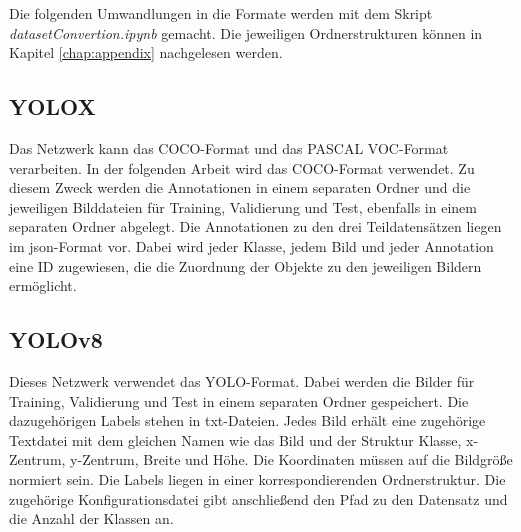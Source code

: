 Die folgenden Umwandlungen in die Formate werden mit dem Skript \textit{datasetConvertion.ipynb} gemacht. Die jeweiligen Ordnerstrukturen können in Kapitel \ref{chap:appendix} nachgelesen werden.


\subsection{YOLOX}
Das Netzwerk kann das COCO-Format und das PASCAL VOC-Format verarbeiten. In der folgenden Arbeit wird das COCO-Format verwendet. Zu diesem Zweck werden die Annotationen in einem separaten Ordner und die jeweiligen Bilddateien für Training, Validierung und Test, ebenfalls in einem separaten Ordner abgelegt. Die Annotationen zu den drei Teildatensätzen liegen im json-Format vor. Dabei wird jeder Klasse, jedem Bild und jeder Annotation eine ID zugewiesen, die die Zuordnung der Objekte zu den jeweiligen Bildern ermöglicht. 



\subsection{YOLOv8}
Dieses Netzwerk verwendet das YOLO-Format. Dabei werden die Bilder für Training, Validierung und Test in einem separaten Ordner gespeichert. Die dazugehörigen Labels stehen in txt-Dateien. Jedes Bild erhält eine zugehörige Textdatei mit dem gleichen Namen wie das Bild und der Struktur Klasse, x-Zentrum, y-Zentrum, Breite und Höhe. Die Koordinaten müssen auf die Bildgröße normiert sein. Die Labels liegen in einer korrespondierenden Ordnerstruktur. Die zugehörige Konfigurationsdatei gibt anschließend den Pfad zu den Datensatz und die Anzahl der Klassen an. 



